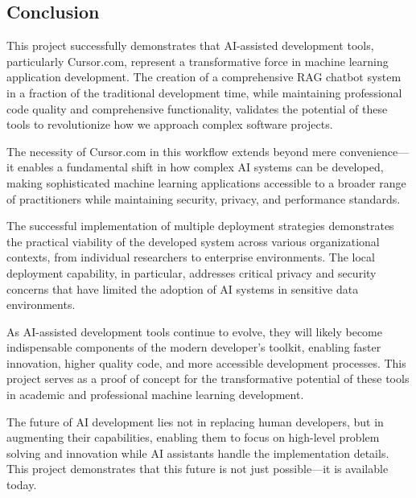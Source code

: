 \documentclass[12pt,letterpaper]{article}
\begin{document}
\subsection{Conclusion}

This project successfully demonstrates that AI-assisted development tools, particularly Cursor.com, represent a transformative force in machine learning application development. The creation of a comprehensive RAG chatbot system in a fraction of the traditional development time, while maintaining professional code quality and comprehensive functionality, validates the potential of these tools to revolutionize how we approach complex software projects.

The necessity of Cursor.com in this workflow extends beyond mere convenience—it enables a fundamental shift in how complex AI systems can be developed, making sophisticated machine learning applications accessible to a broader range of practitioners while maintaining security, privacy, and performance standards.

The successful implementation of multiple deployment strategies demonstrates the practical viability of the developed system across various organizational contexts, from individual researchers to enterprise environments. The local deployment capability, in particular, addresses critical privacy and security concerns that have limited the adoption of AI systems in sensitive data environments.

As AI-assisted development tools continue to evolve, they will likely become indispensable components of the modern developer's toolkit, enabling faster innovation, higher quality code, and more accessible development processes. This project serves as a proof of concept for the transformative potential of these tools in academic and professional machine learning development.

The future of AI development lies not in replacing human developers, but in augmenting their capabilities, enabling them to focus on high-level problem solving and innovation while AI assistants handle the implementation details. This project demonstrates that this future is not just possible—it is available today.

\newpage
\end{document}
